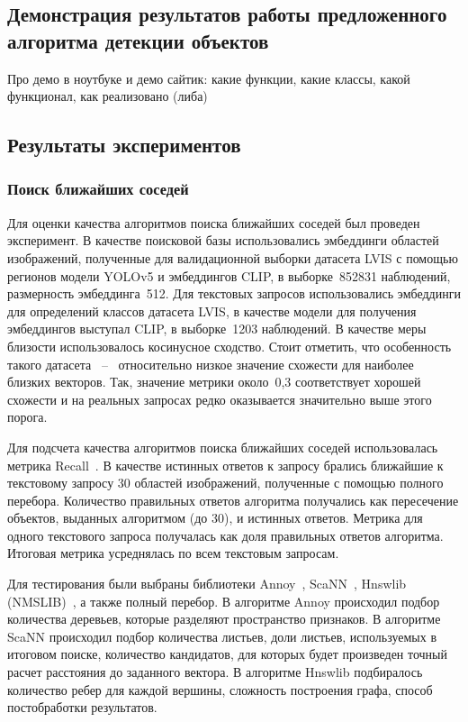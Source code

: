\documentclass[a4paper,14pt]{article}
\begin{document}
    \subsection{Демонстрация результатов работы предложенного алгоритма детекции объектов}
    
    Про демо в ноутбуке и демо сайтик: какие функции, какие классы, какой функционал, как реализовано (либа)
    
    \subsection{Результаты экспериментов}
    
    \subsubsection{Поиск ближайших соседей}
    
    Для оценки качества алгоритмов поиска ближайших соседей был проведен эксперимент.
    В качестве поисковой базы использовались эмбеддинги областей изображений, полученные для валидационной выборки датасета LVIS с помощью регионов модели YOLOv5 и эмбеддингов CLIP, в выборке~852831 наблюдений, размерность эмбеддинга~512.
    Для текстовых запросов использовались эмбеддинги для определений классов датасета LVIS, в качестве модели для получения эмбеддингов выступал CLIP, в выборке~1203 наблюдений.
    В качестве меры близости использовалось косинусное сходство.
    Стоит отметить, что особенность такого датасета ~--~ относительно низкое значение схожести для наиболее близких векторов.
    Так, значение метрики около~0,3 соответствует хорошей схожести и на реальных запросах редко оказывается значительно выше этого порога.
    
    Для подсчета качества алгоритмов поиска ближайших соседей использовалась метрика Recall~\cite{aumuller2020ann}. 
    В качестве истинных ответов к запросу брались ближайшие к текстовому запросу 30 областей изображений, полученные с помощью полного перебора.
    Количество правильных ответов алгоритма получались как пересечение объектов, выданных алгоритмом (до 30), и истинных ответов. 
    Метрика для одного текстового запроса получалась как доля правильных ответов алгоритма.
    Итоговая метрика усреднялась по всем текстовым запросам.
    
    Для тестирования были выбраны библиотеки Annoy~\cite{annoy}, ScaNN~\cite{avq_2020}, Hnswlib (NMSLIB)~\cite{malkov2018efficient}, а также полный перебор.
    В алгоритме Annoy происходил подбор количества деревьев, которые разделяют пространство признаков.
    В алгоритме ScaNN происходил подбор количества листьев, доли листьев, используемых в итоговом поиске, количество кандидатов, для которых будет произведен точный расчет расстояния до заданного вектора.
    В алгоритме Hnswlib подбиралось количество ребер для каждой вершины, сложность построения графа, способ постобработки результатов.
    
\end{document}
